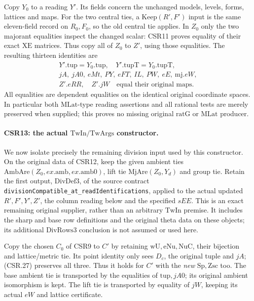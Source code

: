 Copy \(Y_0\) to a reading \(Y'\). Its fields concern the unchanged
models, levels, forms, lattices and maps. For the two central
ties, a \(\mathrm{Keep}(R',F')\) input is the same eleven-field
record on \(R_0,F_0\), so the old central tie applies. In \(Z_0\)
only the two majorant equalities inspect the changed scalar:
CSR11 proves equality of their exact \(\mathrm{XE}\) matrices.
Thus copy all of \(Z_0\) to \(Z'\), using those equalities.
The resulting thirteen identities are
\[
 \begin{gathered}
 Y'.\mathrm{tup}=Y_0.\mathrm{tup},\quad
 Y'.\mathrm{tupT}=Y_0.\mathrm{tupT},\\
 jA,\ jA0,\ eMt,\ PY,\ eFT,\ IL,\ PW,\ eE,\ \mathrm{mj}.eW,\\
 Z'.eRR,\quad Z'.jW
       \quad\text{equal their original maps}.
 \end{gathered}                                                   \tag{CSR.27}
\]
All equalities are dependent equalities on the identical original
coordinate spaces. In particular both \(\mathrm{MLat}\)-type
reading assertions and all rational tests are merely preserved
when supplied; this proves no missing original
\(\mathrm{ratG}\) or \(\mathrm{MLat}\) producer.

\paragraph{CSR13: the actual \(\mathrm{TwIn}/\mathrm{TwArgs}\) constructor.}
\label{claim:CSR13}
We now isolate precisely the remaining division input used by
this constructor. On the original data of CSR12, keep the
given ambient ties \(\mathrm{AmbAre}(Z_0,ex.\mathrm{amb},ex.\mathrm{amb0})\),
lift tie \(\mathrm{MjAre}(Z_0,Y_d)\) and group tie. Retain the
first output, \(\mathrm{DivDef3}\), of the source contract
\texttt{divisionCompatible\_at\_readIdentifications}, applied to
the actual updated \(R',F',Y',Z'\), the column reading below
and the specified \(sEE\). This is an exact remaining original
supplier, rather than an arbitrary \(\mathrm{TwIn}\) premise.
It includes the sharp and base row definitions and the original
theta data on these objects; its additional
\(\mathrm{DivRows3}\) conclusion is not assumed or used here.

Copy the chosen \(C_0\) of CSR9 to \(C'\) by retaining
\(\mathrm{wU,eNu,NuC}\), their bijection and lattice/metric tie.
Its point identity only sees \(D_c\), the original tuple and
\(jA\); (CSR.27) preserves all three. Thus it holds for \(C'\)
with the \emph{new} \(\mathrm{Sp},\mathrm{Zsc}\) too.
The base ambient tie is transported by the equalities of
\(\mathrm{tup},jA0\); its original ambient isomorphism is kept.
The lift tie is transported by equality of \(jW\), keeping its
actual \(eW\) and lattice certificate.

